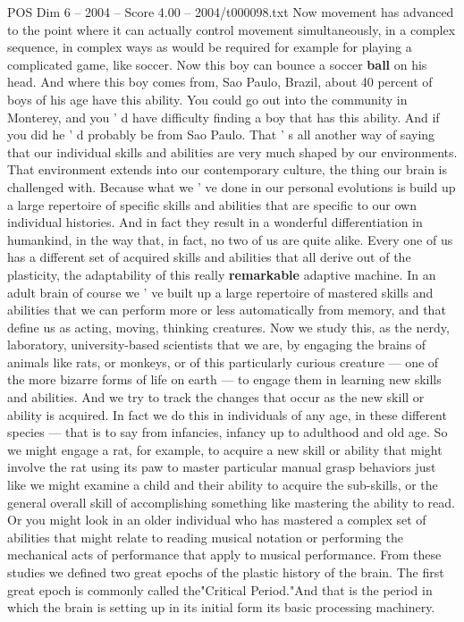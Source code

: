 \begin{textsample}{POS Dim 6 – 2004 – Score 4.00 – 2004/t000098.txt}
Now movement has advanced to the point where it can actually control movement simultaneously, in a complex sequence, in complex ways as would be required for example for playing a complicated game, like soccer.
Now this boy can bounce a soccer \textbf{ball} on his head.
And where this boy comes from, Sao Paulo, Brazil, about 40 percent of boys of his age have this ability.
You could go out into the community in Monterey, and you ' d have difficulty finding a boy that has this ability.
And if you did he ' d probably be from Sao Paulo.
That ' s all another way of saying that our individual skills and abilities are very much shaped by our environments.
That environment extends into our contemporary culture, the thing our brain is challenged with.
Because what we ' ve done in our personal evolutions is build up a large repertoire of specific skills and abilities that are specific to our own individual histories.
And in fact they result in a wonderful differentiation in humankind, in the way that, in fact, no two of us are quite alike.
Every one of us has a different set of acquired skills and abilities that all derive out of the plasticity, the adaptability of this really \textbf{remarkable} adaptive machine.
In an adult brain of course we ' ve built up a large repertoire of mastered skills and abilities that we can perform more or less automatically from memory, and that define us as acting, moving, thinking creatures.
Now we study this, as the nerdy, laboratory, university-based scientists that we are, by engaging the brains of animals like rats, or monkeys, or of this particularly curious creature — one of the more bizarre forms of life on earth — to engage them in learning new skills and abilities.
And we try to track the changes that occur as the new skill or ability is acquired.
In fact we do this in individuals of any age, in these different species — that is to say from infancies, infancy up to adulthood and old age.
So we might engage a rat, for example, to acquire a new skill or ability that might involve the rat using its paw to master particular manual grasp behaviors just like we might examine a child and their ability to acquire the sub-skills, or the general overall skill of accomplishing something like mastering the ability to read.
Or you might look in an older individual who has mastered a complex set of abilities that might relate to reading musical notation or performing the mechanical acts of performance that apply to musical performance.
From these studies we defined two great epochs of the plastic history of the brain.
The first great epoch is commonly called the"Critical Period."And that is the period in which the brain is setting up in its initial form its basic processing machinery.

\end{textsample}
